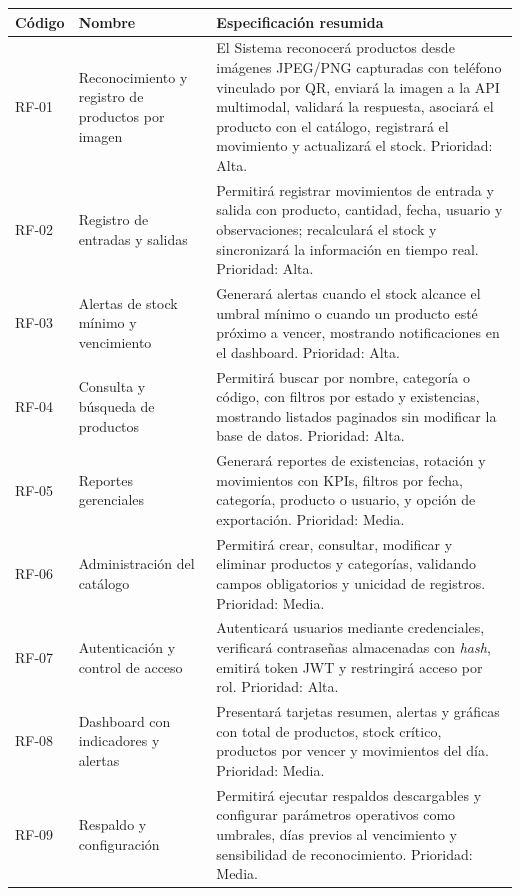 \documentclass[12pt, letterpaper]{report}
\begin{document}
\small
\begin{longtable}{|p{2.1cm}|p{4.1cm}|p{7.1cm}|}
\hline
\textbf{Código} & \textbf{Nombre} & \textbf{Especificación resumida} \\
\hline
RF-01 & Reconocimiento y registro de productos por imagen & El Sistema reconocerá productos desde imágenes JPEG/PNG capturadas con teléfono vinculado por QR, enviará la imagen a la API multimodal, validará la respuesta, asociará el producto con el catálogo, registrará el movimiento y actualizará el stock. Prioridad: Alta. \\
\hline
RF-02 & Registro de entradas y salidas & Permitirá registrar movimientos de entrada y salida con producto, cantidad, fecha, usuario y observaciones; recalculará el stock y sincronizará la información en tiempo real. Prioridad: Alta. \\
\hline
RF-03 & Alertas de stock mínimo y vencimiento & Generará alertas cuando el stock alcance el umbral mínimo o cuando un producto esté próximo a vencer, mostrando notificaciones en el dashboard. Prioridad: Alta. \\
\hline
RF-04 & Consulta y búsqueda de productos & Permitirá buscar por nombre, categoría o código, con filtros por estado y existencias, mostrando listados paginados sin modificar la base de datos. Prioridad: Alta. \\
\hline
RF-05 & Reportes gerenciales & Generará reportes de existencias, rotación y movimientos con KPIs, filtros por fecha, categoría, producto o usuario, y opción de exportación. Prioridad: Media. \\
\hline
RF-06 & Administración del catálogo & Permitirá crear, consultar, modificar y eliminar productos y categorías, validando campos obligatorios y unicidad de registros. Prioridad: Media. \\
\hline
RF-07 & Autenticación y control de acceso & Autenticará usuarios mediante credenciales, verificará contraseñas almacenadas con \textit{hash}, emitirá token JWT y restringirá acceso por rol. Prioridad: Alta. \\
\hline
RF-08 & Dashboard con indicadores y alertas & Presentará tarjetas resumen, alertas y gráficas con total de productos, stock crítico, productos por vencer y movimientos del día. Prioridad: Media. \\
\hline
RF-09 & Respaldo y configuración & Permitirá ejecutar respaldos descargables y configurar parámetros operativos como umbrales, días previos al vencimiento y sensibilidad de reconocimiento. Prioridad: Media. \\
\hline
\end{longtable}
\normalsize
{}
\end{document}
